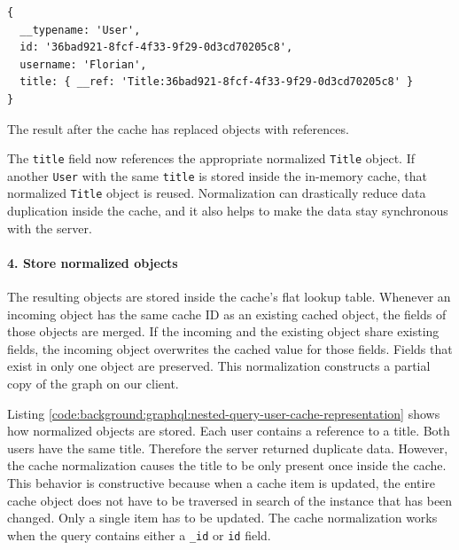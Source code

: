 \ifshowListings
\begin{listing}[H]
    \begin{verbatim}
{
  __typename: 'User',
  id: '36bad921-8fcf-4f33-9f29-0d3cd70205c8',
  username: 'Florian',
  title: { __ref: 'Title:36bad921-8fcf-4f33-9f29-0d3cd70205c8' }
}
    \end{verbatim}
    \caption{The result after the cache has replaced objects with references.}\label{code:background:graphql:nested-query-response-after-replacement}
\end{listing}
\fi

\noindent The \texttt{title} field now references the appropriate normalized \texttt{Title} object. If another \texttt{User} with the same \texttt{title} is stored inside the in-memory cache, that normalized \texttt{Title} object is reused. Normalization can drastically reduce data duplication inside the cache, and it also helps to make the data stay synchronous with the server.

\paragraph{4. Store normalized objects}\label{paragraph:background:graphql:apollo-server-client:data-normalization:store-normalized-objects}

The resulting objects are stored inside the cache's flat lookup table. Whenever an incoming object has the same cache ID as an existing cached object, the fields of those objects are merged. If the incoming and the existing object share existing fields, the incoming object overwrites the cached value for those fields. Fields that exist in only one object are preserved. This normalization constructs a partial copy of the graph on our client. \cite{misc:-:background:graphql:apollo-client-cache-overview}

\bigskip

\noindent Listing \ref{code:background:graphql:nested-query-user-cache-representation} shows how normalized objects are stored. Each user contains a reference to a title. Both users have the same title. Therefore the server returned duplicate data. However, the cache normalization causes the title to be only present once inside the cache. This behavior is constructive because when a cache item is updated, the entire cache object does not have to be traversed in search of the instance that has been changed. Only a single item has to be updated. The cache normalization works when the query contains either a \texttt{\_id} or \texttt{id} field.

